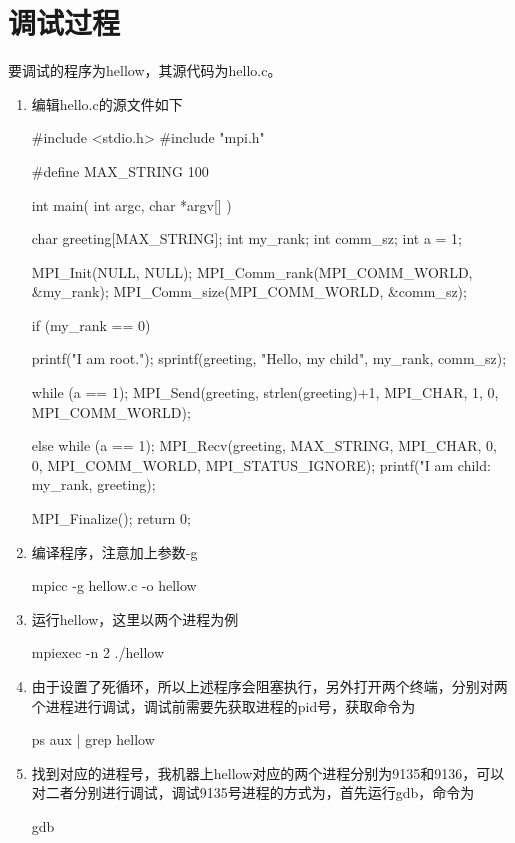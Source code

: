 \documentclass[a4paper]{article}
\begin{document}
\section{调试过程} %
要调试的程序为hellow，其源代码为hello.c。
\begin{enumerate} %
  \item 编辑hello.c的源文件如下
    \begin{pyglist}[language=c]
#include <stdio.h>
#include "mpi.h"

#define MAX_STRING 100
 
int main( int argc, char *argv[] )
{
    char greeting[MAX_STRING];
    int my_rank;
    int comm_sz;
    int a = 1;
    
    MPI_Init(NULL, NULL);
    MPI_Comm_rank(MPI_COMM_WORLD, &my_rank);
    MPI_Comm_size(MPI_COMM_WORLD, &comm_sz);
    
    if (my_rank == 0)
    {
        printf("I am root.\n");
        sprintf(greeting, "Hello, my child", my_rank, comm_sz);
        
        while (a == 1);
        MPI_Send(greeting, strlen(greeting)+1,
          MPI_CHAR, 1, 0, MPI_COMM_WORLD);
    }
    else
    {
        while (a == 1);
        MPI_Recv(greeting, MAX_STRING, MPI_CHAR,
          0, 0, MPI_COMM_WORLD, MPI_STATUS_IGNORE);
        printf("I am child: %
          my_rank, greeting);
    }
    
    MPI_Finalize();
    return 0;
}
    \end{pyglist}

  \item 编译程序，注意加上参数-g
    \begin{pyglist}[language=bash]
      mpicc -g hellow.c -o hellow
    \end{pyglist}

  \item 运行hellow，这里以两个进程为例
    \begin{pyglist}[language=bash]
      mpiexec -n 2 ./hellow
    \end{pyglist}
  
 \item 由于设置了死循环，所以上述程序会阻塞执行，另外打开两个终端，分别对两个进程进行调试，调试前需要先获取进程的pid号，获取命令为
   \begin{pyglist}[language=bash]
     ps aux | grep hellow
   \end{pyglist}
 
 \item 找到对应的进程号，我机器上hellow对应的两个进程分别为9135和9136，可以对二者分别进行调试，调试9135号进程的方式为，首先运行gdb，命令为
   \begin{pyglist}[language=bash]
     gdb
   \end{pyglist}
   

\end{enumerate}
\end{document}

